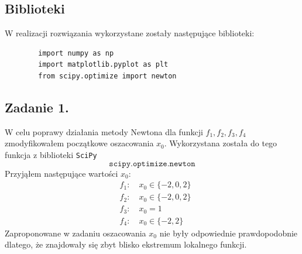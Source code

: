 \documentclass[11pt, leqno]{scrartcl}
\begin{document}
    \subsection{Biblioteki}
    W realizacji rozwiązania wykorzystane zostały następujące
    biblioteki:
    \begin{lstlisting}
        import numpy as np
        import matplotlib.pyplot as plt
        from scipy.optimize import newton
    \end{lstlisting}

    \subsection{Zadanie 1.}
    W celu poprawy działania metody Newtona dla funkcji
    $f_1,f_2,f_3,f_4$ zmodyfikowałem początkowe oszacowania
    $x_0$. Wykorzystana została do tego funkcja z biblioteki
    \texttt{SciPy}
    \[
        \texttt{scipy.optimize.newton}
    \]
    Przyjąłem następujące wartości $x_0$:
    \begin{align*}
        &f_1: \quad x_0\in \{-2,0,2\} \\
        &f_2: \quad x_0\in \{-2,0,2\} \\
        &f_3: \quad x_0=1 \\
        &f_4: \quad x_0\in \{-2,2\}
    \end{align*}
    Zaproponowane w zadaniu oszacowania $x_0$ nie były
    odpowiednie prawdopodobnie dlatego, że znajdowały się
    zbyt blisko ekstremum lokalnego funkcji.
\end{document}
